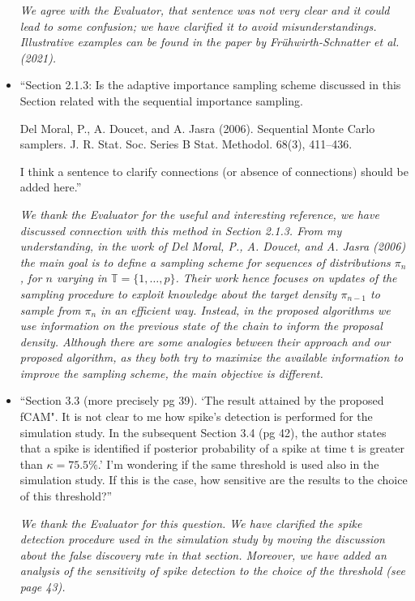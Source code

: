 \documentclass[11pt]{letter}
\begin{document}
\begin{itemize}
{\em 
	We agree with the Evaluator, that sentence was not very clear and it could lead to some confusion; we have clarified it to avoid misunderstandings. Illustrative examples can be found in the paper by Fr\"uhwirth-Schnatter et al. (2021).
}
\vskip3mm

%
\item ``Section 2.1.3:
Is the adaptive importance sampling scheme discussed in this Section related with the sequential importance
sampling.

Del Moral, P., A. Doucet, and A. Jasra (2006). Sequential Monte Carlo samplers. J. R. Stat. Soc. Series B Stat. Methodol. 68(3), 411–436.

I think a sentence to clarify connections (or absence of connections) should be added here.''\vskip1mm

{\em 
	We thank the Evaluator for the useful and interesting reference, we have discussed connection with this method in Section 2.1.3. From my understanding, in the work of Del Moral, P., A. Doucet, and A. Jasra (2006) the main goal is to define a sampling scheme for sequences of distributions $\pi_n$, for $n$ varying in $\mathbb{T} = \{1,\dots,p\}$. Their work hence focuses on updates of the sampling procedure to exploit knowledge about the target density $\pi_{n-1}$ to sample from $\pi_n$ in an efficient way. Instead, in the proposed algorithms we use information on the previous state of the chain to inform the proposal density. Although there are some analogies between their approach and our proposed algorithm, as they both try to maximize the available information to improve the sampling scheme, the main objective is different.
	
}
\vskip3mm

%
\item ``Section 3.3 (more precisely pg 39). `The result attained by the proposed fCAM".
It is not clear to me how spike's detection is performed for the simulation study. In the subsequent Section 3.4 (pg 42), the author states that a spike is identified if posterior probability of a spike at time t is greater than $\kappa=75.5\%$.'
I'm wondering if the same threshold is used also in the simulation study. If this is the case, how sensitive are the results to the choice of this threshold?''\vskip1mm

{\em 
	We thank the Evaluator for this question. We have clarified the spike detection procedure used in the simulation study by moving the discussion about the false discovery rate in that section. Moreover, we have added an analysis of the sensitivity of spike detection to the choice of the threshold (see page 43).
}
\vskip3mm


\end{itemize}
\end{document}
